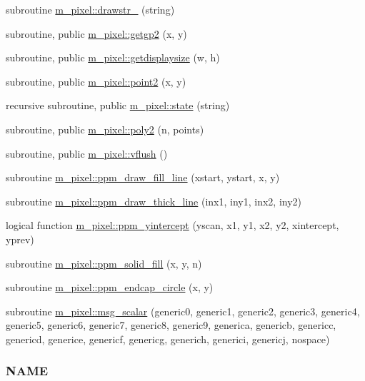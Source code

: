 \begin{DoxyCompactItemize}
subroutine \mbox{\hyperlink{namespacem__pixel_a3f8850328e359af5802954b2f70652f5}{m\+\_\+pixel\+::drawstr\+\_\+}} (string)
\item 
subroutine, public \mbox{\hyperlink{namespacem__pixel_a626d769d3dae0c292e3ef1617ad43efb}{m\+\_\+pixel\+::getgp2}} (x, y)
\item 
subroutine, public \mbox{\hyperlink{namespacem__pixel_acacbc4462423b9aa0f591cbe7aba4ec6}{m\+\_\+pixel\+::getdisplaysize}} (w, h)
\item 
subroutine, public \mbox{\hyperlink{namespacem__pixel_a11234e0b33104eb0afb24f928b072053}{m\+\_\+pixel\+::point2}} (x, y)
\item 
recursive subroutine, public \mbox{\hyperlink{namespacem__pixel_aa24c465b23b0ddda341e97bc206fe249}{m\+\_\+pixel\+::state}} (string)
\item 
subroutine, public \mbox{\hyperlink{namespacem__pixel_a996117d631dce0e92056a0c486be5109}{m\+\_\+pixel\+::poly2}} (n, points)
\item 
subroutine, public \mbox{\hyperlink{namespacem__pixel_ae74cf11194379dbf13069a61b06589a2}{m\+\_\+pixel\+::vflush}} ()
\item 
subroutine \mbox{\hyperlink{namespacem__pixel_a6f75bc951acd07267e0841ca5985d8b7}{m\+\_\+pixel\+::ppm\+\_\+draw\+\_\+fill\+\_\+line}} (xstart, ystart, x, y)
\item 
subroutine \mbox{\hyperlink{namespacem__pixel_a1629b7134d0ea4b0f301ca23df764b8e}{m\+\_\+pixel\+::ppm\+\_\+draw\+\_\+thick\+\_\+line}} (inx1, iny1, inx2, iny2)
\item 
logical function \mbox{\hyperlink{namespacem__pixel_a4924b3a5033acb74a4f4df60a4ba21eb}{m\+\_\+pixel\+::ppm\+\_\+yintercept}} (yscan, x1, y1, x2, y2, xintercept, yprev)
\item 
subroutine \mbox{\hyperlink{namespacem__pixel_aedaf33a27e9899da22c2497aff2af903}{m\+\_\+pixel\+::ppm\+\_\+solid\+\_\+fill}} (x, y, n)
\item 
subroutine \mbox{\hyperlink{namespacem__pixel_aede24c612504a3e416840e6242c2d8fb}{m\+\_\+pixel\+::ppm\+\_\+endcap\+\_\+circle}} (x, y)
\item 
subroutine \mbox{\hyperlink{namespacem__pixel_af907f9c8cb0421cf9c5e6356e355382e}{m\+\_\+pixel\+::msg\+\_\+scalar}} (generic0, generic1, generic2, generic3, generic4, generic5, generic6, generic7, generic8, generic9, generica, genericb, genericc, genericd, generice, genericf, genericg, generich, generici, genericj, nospace)
\begin{DoxyCompactList}\small\item\em \subsubsection*{N\+A\+ME}


\end{DoxyCompactList}
\end{DoxyCompactItemize}
